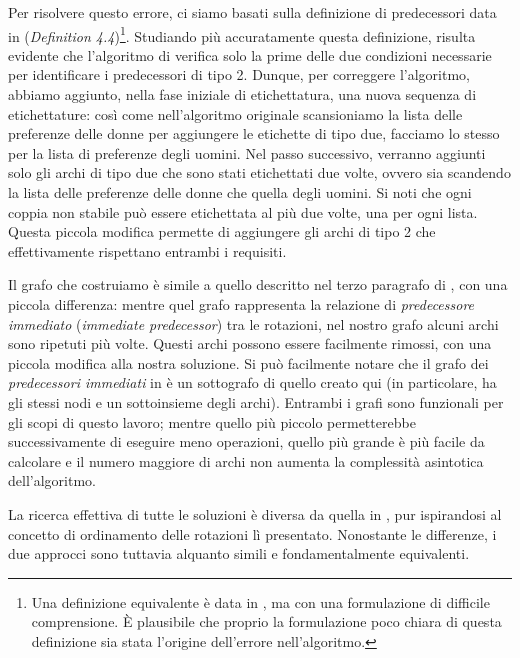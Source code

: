 \documentclass[12pt]{article}
\begin{document}
    Per risolvere questo errore, ci siamo basati sulla definizione di predecessori data in \cite{cai2019representing} (\textit{Definition 4.4})\footnote{Una definizione equivalente è data in \cite{GusfieldBook}, ma con una formulazione di difficile comprensione. È plausibile che proprio la formulazione poco chiara di questa definizione sia stata l'origine dell'errore nell'algoritmo.}. Studiando più accuratamente questa definizione, risulta evidente che l'algoritmo di \cite{GusfieldBook} verifica solo la prime delle due condizioni necessarie per identificare i predecessori di tipo 2. Dunque, per correggere l'algoritmo, abbiamo aggiunto, nella fase iniziale di etichettatura, una nuova sequenza di etichettature: così come nell'algoritmo originale scansioniamo la lista delle preferenze delle donne per aggiungere le etichette di tipo due, facciamo lo stesso per la lista di preferenze degli uomini. Nel passo successivo, verranno aggiunti solo gli archi di tipo due che sono stati etichettati due volte, ovvero sia scandendo la lista delle preferenze delle donne che quella degli uomini. Si noti che ogni coppia non stabile può essere etichettata al più due volte, una per ogni lista. Questa piccola modifica permette di aggiungere gli archi di tipo 2 che effettivamente rispettano entrambi i requisiti.
    
    Il grafo che costruiamo è simile a quello descritto nel terzo paragrafo di \cite{Irving1987AnEA}, con una piccola differenza: mentre quel grafo rappresenta la relazione di \textit{predecessore immediato} (\textit{immediate predecessor}) tra le rotazioni, nel nostro grafo alcuni archi sono ripetuti più volte. Questi archi possono essere facilmente rimossi, con una piccola modifica alla nostra soluzione. Si può facilmente notare che il grafo dei \textit{predecessori immediati} in \cite{Irving1987AnEA} è un sottografo di quello creato qui (in particolare, ha gli stessi nodi e un sottoinsieme degli archi). Entrambi i grafi sono funzionali per gli scopi di questo lavoro; mentre quello più piccolo permetterebbe successivamente di eseguire meno operazioni, quello più grande è più facile da calcolare e il numero maggiore di archi non aumenta la complessità asintotica dell'algoritmo.
    
    La ricerca effettiva di tutte le soluzioni è diversa da quella in \cite{Gusfield3FastAlg}, pur ispirandosi al concetto di ordinamento delle rotazioni lì presentato. Nonostante le differenze, i due approcci sono tuttavia alquanto simili e fondamentalmente equivalenti.
\end{document}
